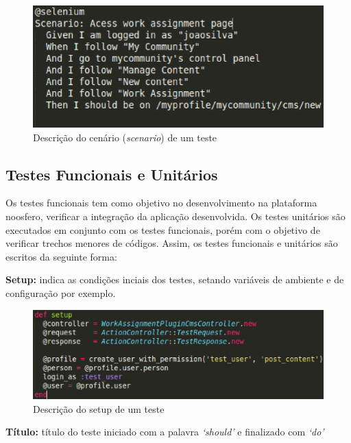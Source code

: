 \begin{enumerate}
\begin{figure}[!h]
    \centering
    \includegraphics[keepaspectratio=true,scale=0.50]
      {figuras/noosfero_scenario.eps}
    \caption{Descrição do cenário (\textit{scenario}) de um teste}
    \label{nosfero_scenario}
\end{figure}

\end{enumerate}



\subsection{Testes Funcionais e Unitários}
%
Os testes funcionais tem como objetivo no desenvolvimento na plataforma noosfero, verificar a integração da aplicação desenvolvida. Os testes unitários são executados em conjunto com os testes funcionais, porém  com o objetivo de verificar trechos menores de códigos. Assim, os testes funcionais e unitários são escritos da seguinte forma:

\textbf{Setup:} indica as condições inciais dos testes, setando variáveis de ambiente e de configuração por exemplo.

\begin{figure}[!h]
    \centering
    \includegraphics[keepaspectratio=true,scale=0.5]
      {figuras/teste_setup.eps}
    \caption{Descrição do setup de um teste}
    \label{nosfero_setup}
\end{figure}

\textbf{Título:} título do teste iniciado com a palavra \textit{‘should’} e finalizado com \textit{‘do’}

